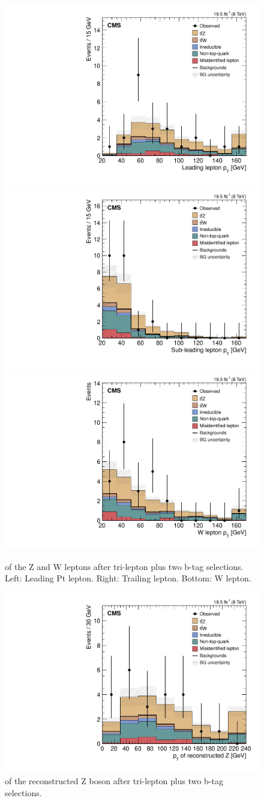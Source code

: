 \begin{figure}[h]
\begin{center}
\includegraphics[width=0.48\linewidth]{Figs/Plots_PreSelections/hZLep1Pt_3L2b.pdf}
\includegraphics[width=0.48\linewidth]{Figs/Plots_PreSelections/hZLep2Pt_3L2b.pdf}
\includegraphics[width=0.48\linewidth]{Figs/Plots_PreSelections/hWLepPt_3L2b.pdf}
\caption{\label{fig:hleppt_3L2b}
\pt of the Z and W leptons after tri-lepton plus two b-tag selections. Left: Leading Pt lepton. Right: Trailing \pt lepton. Bottom: W lepton.
}
\end{center}
\end{figure}

\begin{figure}[h]
\begin{center}
\includegraphics[width=0.48\linewidth]{Figs/Plots_PreSelections/hZPt_3L2b.pdf}
\caption{\label{fig:hzpt_3L2b}
\pt of the reconstructed Z boson after tri-lepton plus two b-tag selections.
}
\end{center}
\end{figure}

